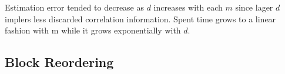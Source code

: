 			

			

Estimation error tended to decrease as $d$ increases with each $m$ since lager $d$ implers less discarded correlation information. Spent time grows to a linear fashion with m while it grows exponentially with $d$.

\subsection{Block Reordering}
